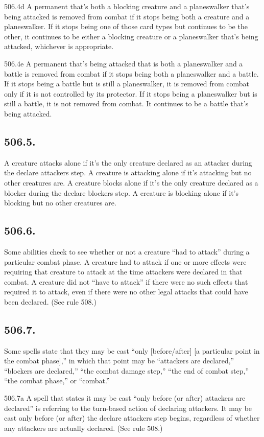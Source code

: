 506.4d A permanent that’s both a blocking creature and a planeswalker that’s being attacked is removed from combat if it stops being both a creature and a planeswalker. If it stops being one of those card types but continues to be the other, it continues to be either a blocking creature or a planeswalker that’s being attacked, whichever is appropriate.

506.4e A permanent that’s being attacked that is both a planeswalker and a battle is removed from combat if it stops being both a planeswalker and a battle. If it stops being a battle but is still a planeswalker, it is removed from combat only if it is not controlled by its protector. If it stops being a planeswalker but is still a battle, it is not removed from combat. It continues to be a battle that’s being attacked.

\subsection*{506.5.}
A creature attacks alone if it’s the only creature declared as an attacker during the declare attackers step. A creature is attacking alone if it’s attacking but no other creatures are. A creature blocks alone if it’s the only creature declared as a blocker during the declare blockers step. A creature is blocking alone if it’s blocking but no other creatures are.

\subsection*{506.6.}
Some abilities check to see whether or not a creature “had to attack” during a particular combat phase. A creature had to attack if one or more effects were requiring that creature to attack at the time attackers were declared in that combat. A creature did not “have to attack” if there were no such effects that required it to attack, even if there were no other legal attacks that could have been declared. (See rule 508.)

\subsection*{506.7.}
Some spells state that they may be cast “only [before/after] [a particular point in the combat phase],” in which that point may be “attackers are declared,” “blockers are declared,” “the combat damage step,” “the end of combat step,” “the combat phase,” or “combat.”

506.7a A spell that states it may be cast “only before (or after) attackers are declared” is referring to the turn-based action of declaring attackers. It may be cast only before (or after) the declare attackers step begins, regardless of whether any attackers are actually declared. (See rule 508.)


